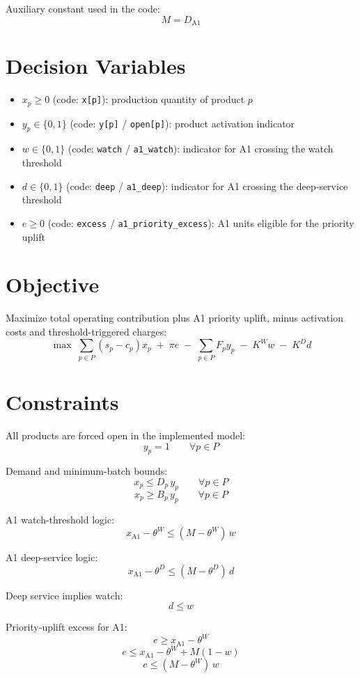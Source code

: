 Auxiliary constant used in the code:
\[
M = D_{\text{A1}}
\]

\section*{Decision Variables}

\begin{itemize}
    \item \(x_p \ge 0\) (code: \texttt{x[p]}): production quantity of product \(p\)
    \item \(y_p \in \{0,1\}\) (code: \texttt{y[p]} / \texttt{open[p]}): product activation indicator
    \item \(w \in \{0,1\}\) (code: \texttt{watch} / \texttt{a1\_watch}): indicator for A1 crossing the watch threshold
    \item \(d \in \{0,1\}\) (code: \texttt{deep} / \texttt{a1\_deep}): indicator for A1 crossing the deep-service threshold
    \item \(e \ge 0\) (code: \texttt{excess} / \texttt{a1\_priority\_excess}): A1 units eligible for the priority uplift
\end{itemize}

\section*{Objective}

Maximize total operating contribution plus A1 priority uplift, minus activation costs and threshold-triggered charges:
\[
\max \;
\sum_{p \in P} (s_p-c_p)x_p
\;+\;
\pi e
\;-\;
\sum_{p \in P} F_p y_p
\;-\;
K^{W} w
\;-\;
K^{D} d
\]

\section*{Constraints}

All products are forced open in the implemented model:
\[
y_p = 1 \qquad \forall p \in P
\]

Demand and minimum-batch bounds:
\[
x_p \le D_p\, y_p \qquad \forall p \in P
\]
\[
x_p \ge B_p\, y_p \qquad \forall p \in P
\]

A1 watch-threshold logic:
\[
x_{\text{A1}} - \theta^{W} \le (M-\theta^{W})\, w
\]

A1 deep-service logic:
\[
x_{\text{A1}} - \theta^{D} \le (M-\theta^{D})\, d
\]

Deep service implies watch:
\[
d \le w
\]

Priority-uplift excess for A1:
\[
e \ge x_{\text{A1}} - \theta^{W}
\]
\[
e \le x_{\text{A1}} - \theta^{W} + M(1-w)
\]
\[
e \le (M-\theta^{W})\, w
\]

